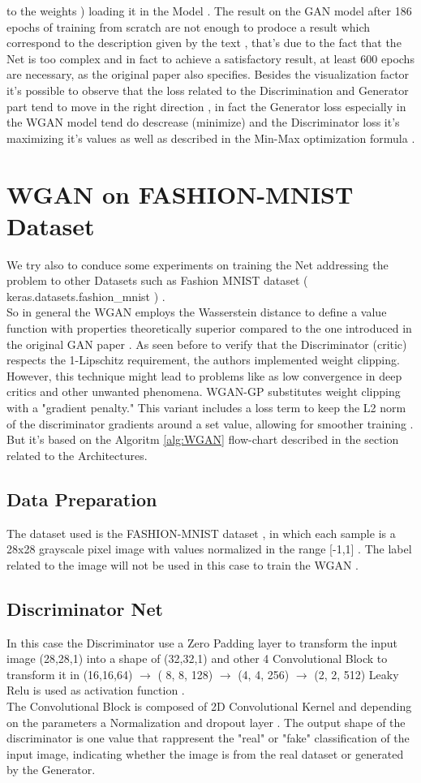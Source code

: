 to the weights ) loading it in the Model . 
The result on the GAN model after 186 epochs of training from scratch are not enough to prodoce a result 
which correspond to the description given by the text , that's due to the fact that the Net is too complex 
and in fact to achieve a satisfactory result, at least 600 epochs are necessary, 
as the original paper also specifies.
Besides the visualization factor it's possible to observe that the loss related to the Discrimination and 
Generator part tend to move in the right direction , in fact the Generator loss especially in the WGAN model
tend do descrease (minimize) and the Discriminator loss it's maximizing it's values as well as described 
in the Min-Max optimization formula .
\\
\section*{WGAN on FASHION-MNIST Dataset}
We try also to conduce some experiments on training the Net addressing the problem to other Datasets 
such as Fashion MNIST dataset ( keras.datasets.fashion\_mnist ) .
\\
So in general the WGAN employs the Wasserstein distance 
to define a value function with properties theoretically superior  
compared to the one introduced in the original GAN paper .
As seen before to verify that the Discriminator (critic) respects the 
1-Lipschitz requirement, the authors implemented weight clipping. 
However, this technique might lead to problems like as low convergence 
in deep critics and other unwanted phenomena.
WGAN-GP substitutes weight clipping with a "gradient penalty." 
This variant includes a loss term to keep the L2 norm of the discriminator 
gradients around a set value, allowing for smoother training . But it's based 
on the Algoritm \ref{alg:WGAN} flow-chart described in the section related to the 
Architectures.
\\
\subsection*{Data Preparation}
The dataset used is the FASHION-MNIST dataset , in which each 
sample is a 28x28 grayscale pixel image with values 
normalized in the range [-1,1] . 
The label related to the image will not be used in this case 
to train the WGAN .
\\
\subsection*{Discriminator Net}
In this case the Discriminator use a Zero Padding layer to transform 
the input image (28,28,1) into a shape of (32,32,1) and other
4 Convolutional Block to transform it in (16,16,64) $\rightarrow$  ( 8, 8, 128)
$\rightarrow$ (4, 4, 256) $\rightarrow$ (2, 2, 512)
Leaky Relu is used as activation function .
\\
The Convolutional Block is composed of 2D Convolutional Kernel 
and depending on the parameters a Normalization and dropout layer .
The output shape of the discriminator is one value that rappresent 
the "real" or "fake" classification of the input image, 
indicating whether the image is from the real dataset or 
generated by the Generator.
